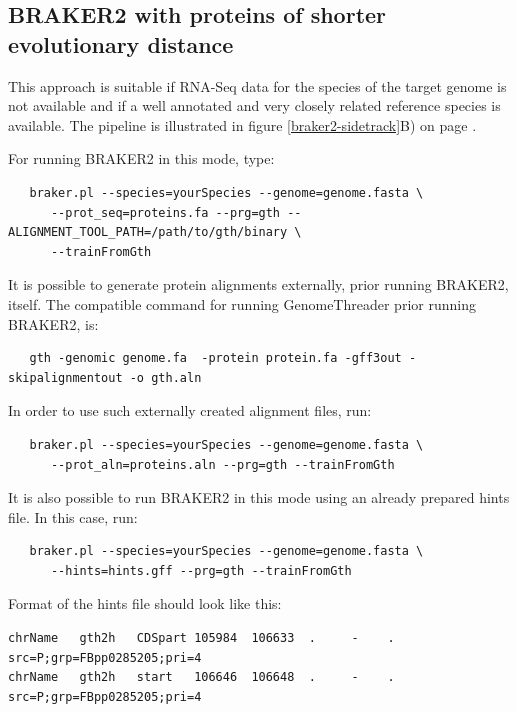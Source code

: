 \documentclass[a4paper,10pt]{report}
\begin{document}
\subsection{BRAKER2 with proteins of shorter evolutionary distance}\label{prot-in}

This approach is suitable if RNA-Seq data for the species of the target genome is not available and if a well annotated and very closely related reference species is available. The pipeline is illustrated in figure \ref{braker2-sidetrack}B) on page \pageref{braker2-sidetrack}.

For running BRAKER2 in this mode, type:

\begin{verbatim}
   braker.pl --species=yourSpecies --genome=genome.fasta \
      --prot_seq=proteins.fa --prg=gth --ALIGNMENT_TOOL_PATH=/path/to/gth/binary \
      --trainFromGth
\end{verbatim}

It is possible to generate protein alignments externally, prior running BRAKER2, itself. The compatible command for running GenomeThreader prior running BRAKER2, is:

\begin{verbatim}
   gth -genomic genome.fa  -protein protein.fa -gff3out -skipalignmentout -o gth.aln
\end{verbatim}


In order to use such externally created alignment files, run:

\begin{verbatim}
   braker.pl --species=yourSpecies --genome=genome.fasta \
      --prot_aln=proteins.aln --prg=gth --trainFromGth
\end{verbatim}

It is also possible to run BRAKER2 in this mode using an already prepared hints file. In this case, run:

\begin{verbatim}
   braker.pl --species=yourSpecies --genome=genome.fasta \
      --hints=hints.gff --prg=gth --trainFromGth
\end{verbatim}

Format of the hints file should look like this:

\begin{verbatim}
chrName   gth2h   CDSpart 105984  106633  .     -    .    src=P;grp=FBpp0285205;pri=4
chrName   gth2h   start   106646  106648  .     -    .    src=P;grp=FBpp0285205;pri=4
\end{verbatim}
\end{document}
